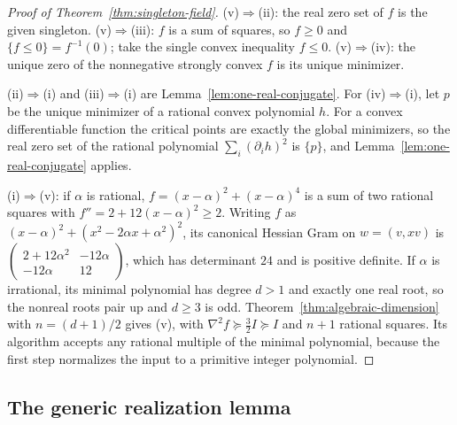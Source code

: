 \begin{proof}[Proof of Theorem~\ref{thm:singleton-field}]
(v)$\Rightarrow$(ii): the real zero set of $f$ is the given singleton.
(v)$\Rightarrow$(iii): $f$ is a sum of squares, so $f\ge0$ and
$\{f\le0\}=f^{-1}(0)$; take the single convex inequality $f\le0$. (v)$\Rightarrow$(iv): the unique zero of
the nonnegative strongly convex $f$ is its unique minimizer.

(ii)$\Rightarrow$(i) and (iii)$\Rightarrow$(i) are
Lemma~\ref{lem:one-real-conjugate}. For (iv)$\Rightarrow$(i), let $p$ be the
unique minimizer of a rational convex polynomial $h$. For a convex
differentiable function the critical points are exactly the global
minimizers, so the real zero set of the rational polynomial
$\sum_i(\partial_ih)^2$ is $\{p\}$, and Lemma~\ref{lem:one-real-conjugate}
applies.

(i)$\Rightarrow$(v): if $\alpha$ is rational, $f=(x-\alpha)^2+(x-\alpha)^4$
is a sum of two rational squares with $f''=2+12(x-\alpha)^2\ge2$. Writing
$f$ as $(x-\alpha)^2+(x^2-2\alpha x+\alpha^2)^2$, its canonical Hessian Gram
on $w=(v,xv)$ is $\left(\begin{smallmatrix}2+12\alpha^2&-12\alpha\\-12\alpha&12
\end{smallmatrix}\right)$, which has determinant $24$ and is positive
definite. If $\alpha$ is irrational, its minimal polynomial has degree $d>1$
and exactly one real root, so the nonreal roots pair up and $d\ge3$ is odd.
Theorem~\ref{thm:algebraic-dimension} with $n=(d+1)/2$ gives (v), with
$\nabla^2f\succeq\tfrac32I\succeq I$ and $n+1$ rational squares. Its
algorithm accepts any rational multiple of the minimal polynomial, because the
first step normalizes the input to a primitive integer polynomial.
\end{proof}


\subsection{The generic realization lemma}
\label{app:algebraic-realization}

